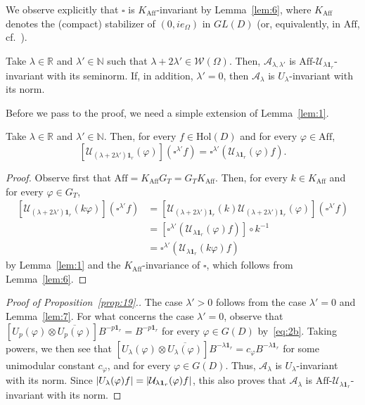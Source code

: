 \documentclass[10.5pt,reqno]{amsart}
\newcommand{\Aff}{\mathrm{Aff}}
\newcommand{\Hol}{\mathrm{Hol}}
\newcommand{\vect}[1]{\mathbf{{#1}}}
\DeclarePairedDelimiter{\abs}{\lvert}{\rvert}
\newcommand{\N}{\mathds{N}}
\newcommand{\R}{\mathds{R}}
\newcommand{\Ac}{\mathcal{A}}
\newcommand{\Uc}{\mathcal{U}}
\newcommand{\Wc}{\mathcal{W}}
\renewcommand{\phi}{\varphi}
\begin{document}
We observe explicitly that $\square$ is $K_\Aff$-invariant by Lemma~\ref{lem:6}, where $K_\Aff$ denotes the (compact) stabilizer of $(0, i e_\Omega)$ in $GL(D)$ (or, equivalently, in $\Aff$, cf.~\cite[Theorem 1.13]{Kaneyuki}). 


\begin{prop}\label{prop:19}
	Take $\lambda\in \R$ and $\lambda'\in \N$ such that $\lambda+2 \lambda'\in \Wc(\Omega)$. Then, $\Ac_{\lambda,\lambda'}$ is  $\Aff$-$\Uc_{\lambda\vect 1_r}$-invariant with its seminorm.  If, in addition, $\lambda'=0$, then $\Ac_\lambda$ is $U_\lambda$-invariant with its norm.
\end{prop}

Before we pass to the proof, we need a simple extension of Lemma~\ref{lem:1}.

\begin{lem}\label{lem:7}
	Take $\lambda\in \R$ and $\lambda'\in \N$. Then,  for every $f\in \Hol(D)$ and for every $\phi\in \Aff$,
	\[
	[\Uc_{(\lambda+2 \lambda')\vect 1_r}(\phi)](\square^{\lambda'} f)= \square^{\lambda'}(\Uc_{\lambda\vect 1_r}(\phi)f).
	\]
\end{lem}

\begin{proof}
	Observe first that $\Aff=K_\Aff G_T=G_T K_\Aff$. Then, for every $k\in K_\Aff$ and for every $\phi\in G_T$,
	\[
	\begin{split}
		[\Uc_{(\lambda+2 \lambda')\vect 1_r}(k\phi)](\square^{\lambda'} f)&=[\Uc_{(\lambda+2 \lambda')\vect 1_r}(k)\Uc_{(\lambda+2 \lambda')\vect 1_r}(\phi)](\square^{\lambda'} f)\\
			&=[\square^{\lambda'}(\Uc_{\lambda\vect 1_r}(\phi)f)]\circ k^{-1}\\
			&=\square^{\lambda'}(\Uc_{\lambda\vect 1_r}(k\phi)f)
	\end{split}
	\]
	by Lemma~\ref{lem:1} and the $K_\Aff$-invariance of $\square$, which follows from Lemma~\ref{lem:6}.
\end{proof}


\begin{proof}[Proof of Proposition~\ref{prop:19}.]
	The case $\lambda'>0$  follows from the case $\lambda'=0$ and Lemma~\ref{lem:7}. For what concerns the case $\lambda'=0$, observe that $[U_p(\phi)\otimes \overline{U_p(\phi)}] B^{-p \vect 1_r}=B^{-p \vect 1_r}$ for every $\phi\in G(D)$ by~\eqref{eq:2b}. Taking powers, we then see that  $[U_\lambda(\phi)\otimes \overline{U_\lambda(\phi)}] B^{-\lambda \vect 1_r}= c_\phi B^{-\lambda \vect 1_r}$ for some unimodular constant $c_\phi$, and for every $\phi\in G(D)$. Thus, $\Ac_\lambda$ is $U_\lambda$-invariant with its norm. Since $\abs{U_\lambda(\phi)f}=\abs{\Uc_{\lambda \vect 1_r}(\phi)f}$, this also proves that $\Ac_\lambda$ is $\Aff$-$\Uc_{\lambda \vect 1_r}$-invariant with its norm.
\end{proof}
\end{document}
